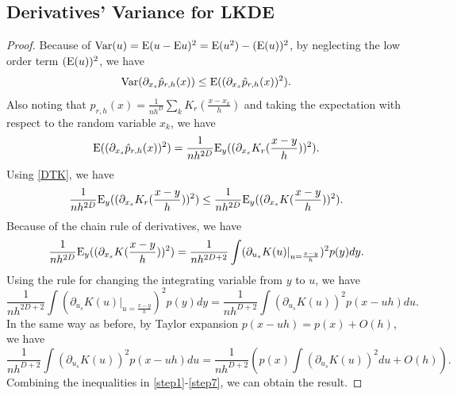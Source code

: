 \documentclass[aos,preprint]{imsart}
\theoremstyle{remark}
\begin{document}
\begin{appendix}
\subsection{Derivatives' Variance for LKDE}
\begin{proof}\label{Derivatives' Variance for LKDE}
Because of ${{\rm Var}}(u) = {\rm E}(u - {\rm E}u)^2 = {\rm E}(u^2) - ({\rm E}(u))^2$, by neglecting the low order  term $({\rm E}(u))^2$,  we have
\begin{equation}\label{step1}
{{\rm Var}}(\partial_{x_s} \hat{p}_{r,h}(x)) \leq {\rm E} ((\partial_{x_s} \hat{p}_{r,h}(x))^2) .
\end{equation}
Also noting that $\hat{p}_{r,h}(x)=\frac{1}{n h^D} \sum_k K_r(\frac{x-x_k}{h})$ and taking the expectation with respect to the random variable $x_k$, we have
\begin{equation}\label{step2}
 {\rm E} ((\partial_{x_s} \hat{p}_{r,h}(x))^2) = \frac{1}{n h^{2D}} {\rm E}_y ((\partial_{x_s } K_r (\frac{x - y}{h}))^2).
\end{equation}
Using \eqref{DTK}, we have
\begin{equation}\label{step3}
\frac{1}{n h^{2D}} {\rm E}_y ((\partial_{x_s } K_r (\frac{x - y}{h}))^2) \leq \frac{1}{n h^{2D}} {\rm E}_y ((\partial_{x_s } K(\frac{x - y}{h}))^2).
\end{equation}
Because of the chain rule of derivatives, we have
\begin{equation}\label{step4}
\frac{1}{n h^{2D}} {\rm E}_y ((\partial_{x_s} K(\frac{x - y}{h}))^2) = \frac{1}{n h^{2D+2}} \int (\partial_{u_s } K (u) |_{u=\frac{x - y}{h}})^2 p(y) dy.
\end{equation}
Using the rule for changing the integrating variable from $y$ to $u$, we have 
\begin{equation}\label{step5}
\frac{1}{n h^{2D+2}} \int (\partial_{u_s } K (u) |_{u=\frac{x - y}{h}})^2 p(y) dy = \frac{1}{n h^{D+2}} \int (\partial_{u_s } K (u) )^2 p(x-uh) du.
\end{equation}\label{step6}
In the same way as before, by Taylor expansion $p(x-uh)=p(x)+O(h)$, we have
\begin{equation}\label{step7}
\frac{1}{n h^{D+2}} \int (\partial_{u_s } K (u) )^2 p(x-uh) du = \frac{1}{n h^{D+2}}  (p(x) \int (\partial_{u_s } K (u) )^2   du + O(h)).
\end{equation}
Combining the inequalities in \eqref{step1}-\eqref{step7}, we can obtain the result.
\end{proof}

\end{appendix}
\end{document}

